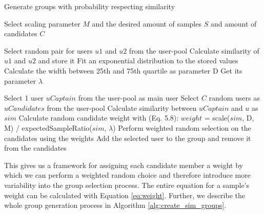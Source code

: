 \begin{algorithm}
	\caption{Generate groups with probability respecting similarity}
	\begin{algorithmic}[1]
	    \State Select scaling parameter $M$ and the desired amount of samples $S$ and amount of candidates $C$
	
	    \vspace{3mm}
	
    	    \State Select random pair for users $u1$ and $u2$ from the user-pool
    	    \State Calculate similarity of $u1$ and $u2$ and store it
	    \EndFor
	    \State Fit an exponential distribution to the stored values
	    \State Calculate the width between 25th and 75th quartile as parameter D
	    \State Get its parameter $\lambda$
	    
	    \vspace{3mm}
	    
    	    \State Select 1 user $uCaptain$ from the user-pool as main user
    	    \State Select $C$ random users as $uCandidates$ from the user-pool
    	        \State Calculate similarity between $uCaptain$ and $u$ as $sim$
    	        \State Calculate random candidate weight with (Eq. 5.8):
    	        \State $weight$ = scale($sim$, D, M) / expectedSampleRatio($sim$, $\lambda$)
    	    \EndFor
    	    \State Perform weighted random selection on the candidates using the weights
    	    \State Add the selected user to the group and remove it from the candidates
    	    \EndFor
        \EndFor
	\end{algorithmic}
	\label{alg:create_sim_groups}
\end{algorithm} 



This gives us a framework for assigning each candidate member a weight by which we can perform a weighted random choice and therefore introduce more variability into the group selection process. The entire equation for a sample's weight can be calculated with Equation \ref{eq:weight}. Further, we describe the whole group generation process in Algorithm \ref{alg:create_sim_groups}.











